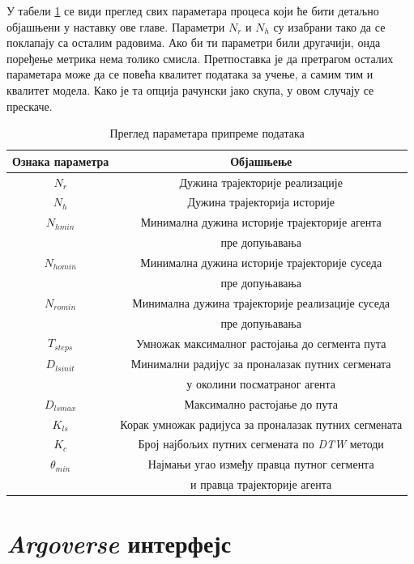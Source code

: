 \documentclass[11pt,oneside]{memoir}
\begin{document}
У табели \ref{dp-params-table} се види преглед свих параметара процеса који ће
бити детаљно објашњени у наставку ове главе. Параметри $N_r$ и $N_h$ су изабрани тако да се поклапају
са осталим радовима. Ако би ти параметри били другачији, онда поређење метрика нема толико смисла. 
Претпоставка је да претрагом осталих параметара може да се повећа квалитет података за учење, а самим тим
и квалитет модела. Како је та опција рачунски јако скупа, у овом случају се прескаче.

\begin{table}[H]
  \centering
  \begin{tabular}{c|c}
    Ознака параметра & Објашњење \\
    \hline
    $N_r$ & Дужина трајекторије реализације \\
    \hline
    $N_h$ & Дужина трајекторија историје \\
    \hline
    $N_{hmin}$ & Минимална дужина историје трајекторије агента \\
    & пре допуњавања \\
    \hline
    $N_{homin}$ & Минимална дужина историје трајекторије суседа \\
    & пре допуњавања \\
    \hline
    $N_{romin}$ & Минимална дужина трајекторије реализације суседа \\
    & пре допуњавања \\
    \hline
    $T_{steps}$ & Умножак максималног растојања до сегмента пута \\
    \hline
    $D_{lsinit}$ & Минимални радијус за проналазак путних сегмената \\
    & у околини посматраног агента \\
    \hline
    $D_{lsmax}$ & Максимално растојање до пута \\
    \hline
    $K_{ls}$ & Корак умножак радијуса за проналазак путних сегмената \\
    \hline
    $K_c$ & Број најбољих путних сегмената по \textit{DTW} методи \\
    \hline
    $\theta_{min}$ & Најмањи угао између правца путног сегмента \\
    & и правца трајекторије агента
  \end{tabular}
  \caption{Преглед параметара припреме података}
  \label{dp-params-table}
\end{table}

\section{\textit{Argoverse} интерфејс}
\end{document}
